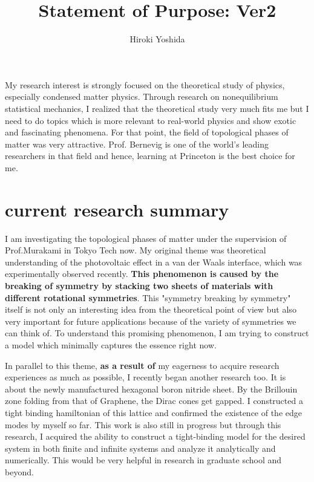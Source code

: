 \documentclass[a4]{article}
\title{Statement of Purpose: Ver2}
\author{Hiroki Yoshida}
\date{}
\begin{document}
\maketitle

My research interest is strongly focused on the theoretical study of physics, especially condensed matter physics. Through research on nonequilibrium statistical mechanics, I realized that the theoretical study very much fits me but I need to do topics which is more relevant to real-world physics and show exotic and fascinating phenomena. For that point, the field of topological phases of matter was very attractive. Prof. Bernevig is one of the world's leading researchers in that field and hence, learning at Princeton is the best choice for me.\par


\section{current research summary}
I am investigating the topological phases of matter under the supervision of Prof.Murakami in Tokyo Tech now. My original theme was theoretical understanding of the photovoltaic effect in a van der Waals interface, which was experimentally observed recently. \textbf{This phenomenon is caused by the breaking of symmetry by stacking two sheets of materials with different rotational symmetries}. This "symmetry breaking by symmetry" itself is not only an interesting idea from the theoretical point of view but also very important for future applications because of the variety of symmetries we can think of. To understand this promising phenomenon, I am trying to construct a model which minimally captures the essence right now. \par

In parallel to this theme, \textbf{as a result of} my eagerness to acquire research experiences as much as possible, I recently began another research too. It is about the newly manufactured hexagonal boron nitride sheet. By the Brillouin zone folding from that of Graphene, the Dirac cones get gapped. I constructed a tight binding hamiltonian of this lattice and confirmed the existence of the edge modes by myself so far. This work is also still in progress but through this research, I acquired the ability to construct a tight-binding model for the desired system in both finite and infinite systems and analyze it analytically and numerically. This would be very helpful in research in graduate school and beyond.\par
\end{document}
